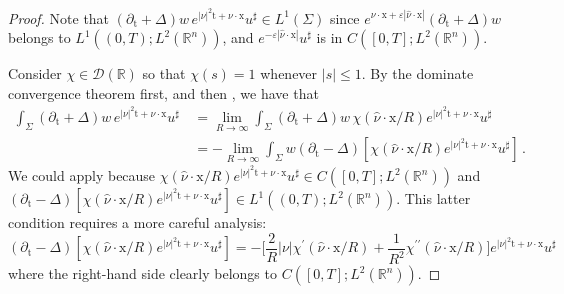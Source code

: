 \documentclass[10pt,a4paper]{amsart}
\newcommand{\R}{\mathbb{R}}
\newcommand{\tm}{\mathrm{t}}
\newcommand{\x}{\mathrm{x}}
\begin{document}
\begin{proof}
Note that $( \partial_{\tm}+\Delta) w \, e^{|\nu|^2 \tm + \nu \cdot \x} u^\sharp \in L^1(\Sigma)$
since $e^{\nu \cdot \x + \varepsilon |\hat \nu \cdot \x|} ( \partial_{\tm}+\Delta) w $ belongs to 
$ L^1((0,T); L^2(\R^n))$, and $ e^{-\varepsilon |\hat \nu \cdot \x|} u^\sharp $ is in 
$C([0, T] ; L^{2}(\mathbb{R}^{n}))$.

Consider $\chi \in \mathcal{D}(\R)$ so that $\chi(s) = 1$ whenever $|s| \leq 1$.
By the dominate convergence theorem first, and then , we have that
\begin{align*}
\int_{\Sigma}( \partial_{\tm}+\Delta) w \, e^{|\nu|^2 \tm + \nu \cdot \x} u^\sharp \, 
&= \lim_{R\to \infty} \int_{\Sigma}( \partial_{\tm}+\Delta) w \, \chi(\hat \nu \cdot \x/R) e^{|\nu|^2 \tm + \nu \cdot \x} u^\sharp \, \\
&= - \lim_{R\to \infty} \int_{\Sigma} w (\partial_{\tm}-\Delta) [\chi(\hat \nu \cdot \x/R) e^{|\nu|^2 \tm + \nu \cdot \x} u^\sharp] \, .
\end{align*}
We could apply  because
$\chi(\hat \nu \cdot \x/R) e^{|\nu|^2 \tm + \nu \cdot \x} u^\sharp \in C([0, T] ; L^{2}(\mathbb{R}^{n}))$ and $(\partial_{\tm}-\Delta) [\chi(\hat \nu \cdot \x/R) e^{|\nu|^2 \tm + \nu \cdot \x} u^\sharp] \in L^{1}((0, T) ; L^{2}(\mathbb{R}^{n}))$. This latter condition requires a more careful
analysis:
\[ (\partial_{\tm}-\Delta) [\chi(\hat \nu \cdot \x/R) e^{|\nu|^2 \tm + \nu \cdot \x} u^\sharp] = - \Big[\frac{2}{R} |\nu| \chi^\prime (\hat \nu \cdot \x/R) + \frac{1}{R^2} \chi^{\prime \prime} (\hat \nu \cdot \x/R) \Big] e^{|\nu|^2 \tm + \nu \cdot \x} u^\sharp \]
where the right-hand side clearly belongs to $C([0, T] ; L^{2}(\mathbb{R}^{n}))$.


\end{proof}
\end{document}
